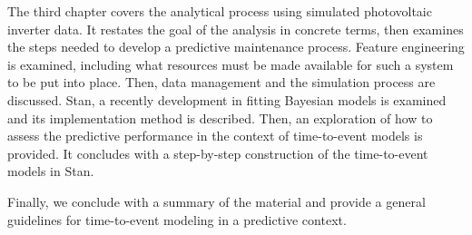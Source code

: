 The third chapter covers the analytical process using simulated photovoltaic inverter data. It restates the goal of the analysis in concrete terms, then examines the steps needed to develop a predictive maintenance process. Feature engineering is examined, including what resources must be made available for such a system to be put into place. Then, data management and the simulation process are discussed. Stan, a recently development in fitting Bayesian models is examined and its implementation method is described. Then, an exploration of how to assess the predictive performance in the context of time-to-event models is provided. It concludes with a step-by-step construction of the time-to-event models in Stan. 

Finally, we conclude with a summary of the material and provide a general guidelines for time-to-event modeling in a predictive context.




